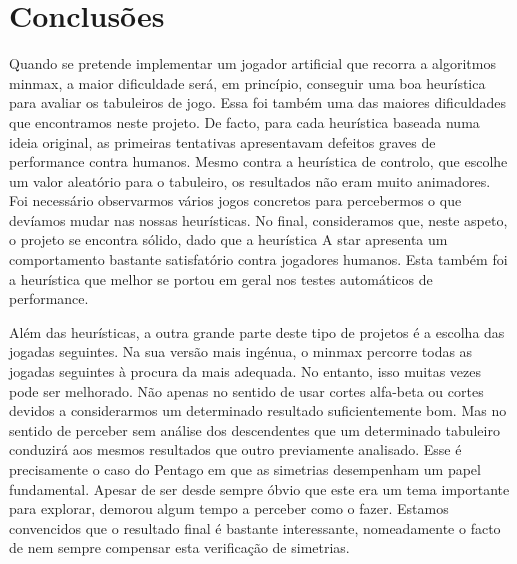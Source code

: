 
\section{Conclusões}

Quando se pretende implementar um jogador artificial que recorra a algoritmos minmax, a maior dificuldade será, em princípio, conseguir uma boa heurística para avaliar os tabuleiros de jogo. Essa foi também uma das maiores dificuldades que encontramos neste projeto. De facto, para cada heurística baseada numa ideia original, as primeiras tentativas apresentavam defeitos graves de performance contra humanos. Mesmo contra a heurística de controlo, que escolhe um valor aleatório para o tabuleiro, os resultados não eram muito animadores. Foi necessário observarmos vários jogos concretos para percebermos o que devíamos mudar nas nossas heurísticas. No final, consideramos que, neste aspeto, o projeto se encontra sólido, dado que a heurística A star apresenta um comportamento bastante satisfatório contra jogadores humanos. Esta também foi a heurística que melhor se portou em geral nos testes automáticos de performance.

Além das heurísticas, a outra grande parte deste tipo de projetos é a escolha das jogadas seguintes. Na sua versão mais ingénua, o minmax percorre todas as jogadas seguintes à procura da mais adequada. No entanto, isso muitas vezes pode ser melhorado. Não apenas no sentido de usar cortes alfa-beta ou cortes devidos a considerarmos um determinado resultado suficientemente bom. Mas no sentido de perceber sem análise dos descendentes que um determinado tabuleiro conduzirá aos mesmos resultados que outro previamente analisado. Esse é precisamente o caso do Pentago em que as simetrias desempenham um papel fundamental. Apesar de ser desde sempre óbvio que este era um tema importante para explorar, demorou algum tempo a perceber como o fazer. Estamos convencidos que o resultado final é bastante interessante, nomeadamente o facto de nem sempre compensar esta verificação de simetrias.